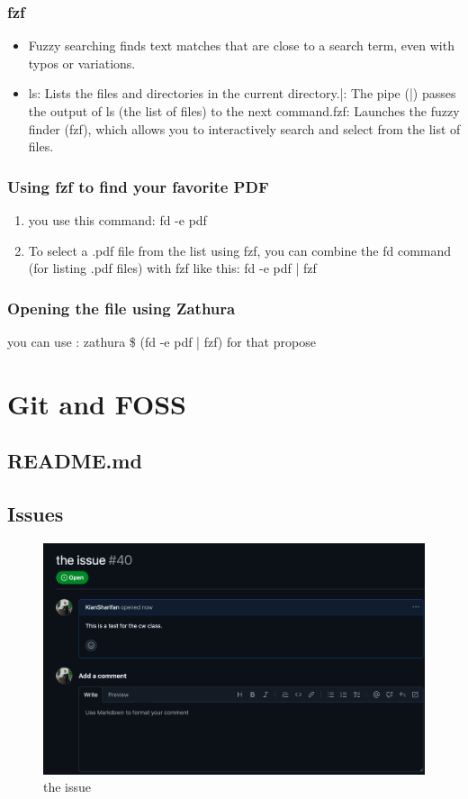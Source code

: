 \documentclass{article}
\begin{document}
\subsubsection{fzf}
\begin{itemize}
    \item Fuzzy searching finds text matches that are close to a search term, even with typos or variations.
    \item ls: Lists the files and directories in the current directory.\newline|: The pipe (|) passes the output of ls (the list of files) to the next command.\newline fzf: Launches the fuzzy finder (fzf), which allows you to interactively search and select from the list of files.
\end{itemize}
\newpage
\subsubsection{Using fzf to find your favorite PDF}
\begin{enumerate}
    \item you use this command: fd -e pdf
    \item To select a .pdf file from the list using fzf, you can combine the fd command (for listing .pdf files) with fzf like this: fd -e pdf | fzf
\end{enumerate}
\subsubsection{Opening the file using Zathura}
you can use : zathura \$ (fd -e pdf | fzf) for that propose

\section{Git and FOSS}
\subsection{README.md}
\subsection{Issues}
\begin{figure}[h]
    \centering
    \includegraphics[width=0.75\linewidth]{pic.png}
    \caption{the issue}
    \label{fig:enter-label}
\end{figure}
\end{document}
